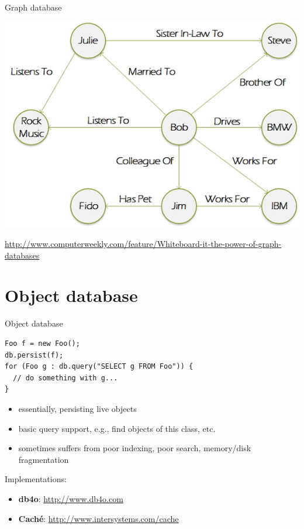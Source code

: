 \documentclass{beamer}
\begin{document}
\begin{frame}{Graph database}

  \begin{center}
    \includegraphics[width=0.8\linewidth]{Graph-database-sketch-580px.jpg}
  \end{center}
  {\footnotesize \url{http://www.computerweekly.com/feature/Whiteboard-it-the-power-of-graph-databases}}

\end{frame}

\section{Object database}

\begin{frame}[fragile]{Object database}

\begin{verbatim}
Foo f = new Foo();
db.persist(f);
for (Foo g : db.query("SELECT g FROM Foo")) {
  // do something with g...
}
\end{verbatim}

  \begin{itemize}
  \item essentially, persisting live objects
  \item basic query support, e.g., find objects of this class, etc.
  \item sometimes suffers from poor indexing, poor search, memory/disk
    fragmentation
  \end{itemize}

  Implementations:
  \begin{itemize}
  \item \textbf{db4o}: \url{http://www.db4o.com}
  \item \textbf{Cach\'{e}}: \url{http://www.intersystems.com/cache}
  \end{itemize}

\end{frame}
\end{document}

